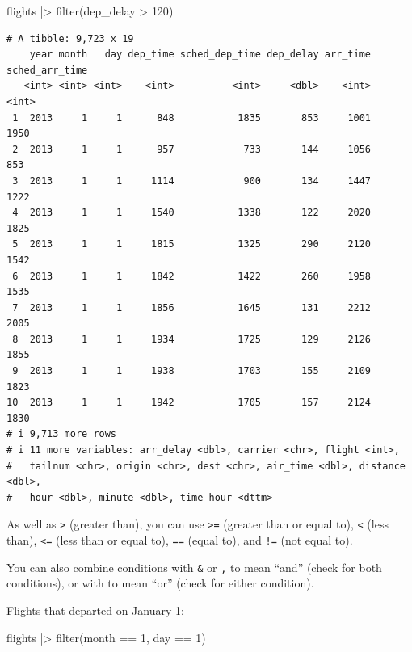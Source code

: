 \documentclass[
  letterpaper,
  DIV=11,
  numbers=noendperiod]{scrreprt}
\newenvironment{Shaded}{\begin{snugshade}}{\end{snugshade}}
\newcommand{\DecValTok}[1]{\textcolor[rgb]{0.68,0.00,0.00}{#1}}
\newcommand{\FunctionTok}[1]{\textcolor[rgb]{0.28,0.35,0.67}{#1}}
\newcommand{\NormalTok}[1]{\textcolor[rgb]{0.00,0.23,0.31}{#1}}
\newcommand{\SpecialCharTok}[1]{\textcolor[rgb]{0.37,0.37,0.37}{#1}}
\begin{document}
\begin{Shaded}
\begin{Highlighting}[]
\NormalTok{flights }\SpecialCharTok{|\textgreater{}}
  \FunctionTok{filter}\NormalTok{(dep\_delay }\SpecialCharTok{\textgreater{}} \DecValTok{120}\NormalTok{)}
\end{Highlighting}
\end{Shaded}

\begin{verbatim}
# A tibble: 9,723 x 19
    year month   day dep_time sched_dep_time dep_delay arr_time sched_arr_time
   <int> <int> <int>    <int>          <int>     <dbl>    <int>          <int>
 1  2013     1     1      848           1835       853     1001           1950
 2  2013     1     1      957            733       144     1056            853
 3  2013     1     1     1114            900       134     1447           1222
 4  2013     1     1     1540           1338       122     2020           1825
 5  2013     1     1     1815           1325       290     2120           1542
 6  2013     1     1     1842           1422       260     1958           1535
 7  2013     1     1     1856           1645       131     2212           2005
 8  2013     1     1     1934           1725       129     2126           1855
 9  2013     1     1     1938           1703       155     2109           1823
10  2013     1     1     1942           1705       157     2124           1830
# i 9,713 more rows
# i 11 more variables: arr_delay <dbl>, carrier <chr>, flight <int>,
#   tailnum <chr>, origin <chr>, dest <chr>, air_time <dbl>, distance <dbl>,
#   hour <dbl>, minute <dbl>, time_hour <dttm>
\end{verbatim}

As well as \texttt{\textgreater{}} (greater than), you can use
\texttt{\textgreater{}=} (greater than or equal to),
\texttt{\textless{}} (less than), \texttt{\textless{}=} (less than or
equal to), \texttt{==} (equal to), and \texttt{!=} (not equal to).

You can also combine conditions with \texttt{\&} or \texttt{,} to mean
``and'' (check for both conditions), or with \texttt{\textbar{}} to mean
``or'' (check for either condition).

Flights that departed on January 1:

\begin{Shaded}
\begin{Highlighting}[]
\NormalTok{flights }\SpecialCharTok{|\textgreater{}}
  \FunctionTok{filter}\NormalTok{(month }\SpecialCharTok{==} \DecValTok{1}\NormalTok{, day }\SpecialCharTok{==} \DecValTok{1}\NormalTok{)}
\end{Highlighting}
\end{Shaded}
\end{document}
